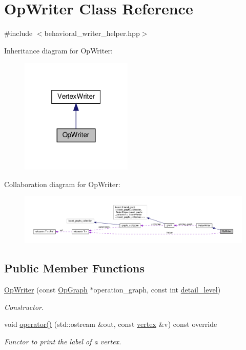 \hypertarget{classOpWriter}{}\section{Op\+Writer Class Reference}
\label{classOpWriter}


{\ttfamily \#include $<$behavioral\+\_\+writer\+\_\+helper.\+hpp$>$}



Inheritance diagram for Op\+Writer\+:
\nopagebreak
\begin{figure}[H]
\begin{center}
\leavevmode
\includegraphics[width=151pt]{d7/d85/classOpWriter__inherit__graph}
\end{center}
\end{figure}


Collaboration diagram for Op\+Writer\+:
\nopagebreak
\begin{figure}[H]
\begin{center}
\leavevmode
\includegraphics[width=350pt]{dc/de2/classOpWriter__coll__graph}
\end{center}
\end{figure}
\subsection*{Public Member Functions}
\begin{DoxyCompactItemize}
\item 
\hyperlink{classOpWriter_a236c995006cfce8a9b9984ced76ea9cc}{Op\+Writer} (const \hyperlink{structOpGraph}{Op\+Graph} $\ast$operation\+\_\+graph, const int \hyperlink{classVertexWriter_aa22b6ea9c9a75b7fce3767b00e08ed3f}{detail\+\_\+level})
\begin{DoxyCompactList}\small\item\em Constructor. \end{DoxyCompactList}\item 
void \hyperlink{classOpWriter_a58cae1db8599d723605d387a61c0c967}{operator()} (std\+::ostream \&out, const \hyperlink{graph_8hpp_abefdcf0544e601805af44eca032cca14}{vertex} \&v) const override
\begin{DoxyCompactList}\small\item\em Functor to print the label of a vertex. \end{DoxyCompactList}\end{DoxyCompactItemize}
